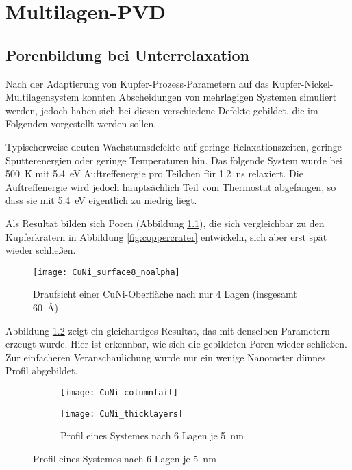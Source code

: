 \chapter{Multilagen-PVD}
\label{appendix:multilayer}

\section{Porenbildung bei Unterrelaxation}

Nach der Adaptierung von Kupfer-Prozess-Parametern auf das Kupfer-Nickel-Multilagensystem konnten Abscheidungen von mehrlagigen Systemen simuliert werden, jedoch haben sich bei diesen verschiedene Defekte gebildet, die im Folgenden vorgestellt werden sollen.

Typischerweise deuten Wachstumsdefekte auf geringe Relaxationszeiten, geringe Sputterenergien oder geringe Temperaturen hin.
Das folgende System wurde bei \SI{500}{\kelvin} mit \SI{5.4}{\electronvolt} Auftreffenergie pro Teilchen für \SI{1.2}{\nano\second} relaxiert.
Die Auftreffenergie wird jedoch hauptsächlich Teil vom Thermostat abgefangen, so dass sie mit \SI{5.4}{\electronvolt} eigentlich zu niedrig liegt.

Als Resultat bilden sich Poren (Abbildung \ref{fig:multilayer_surfacefail}), die sich vergleichbar zu den Kupferkratern in Abbildung \ref{fig:coppercrater} entwickeln, sich aber erst spät wieder schließen.

\begin{figure}[h]
  \centering
  \texttt{[image: CuNi\_surface8\_noalpha]}
  \caption{Draufsicht einer CuNi-Oberfläche nach nur 4 Lagen (insgesamt \SI{60}{\angstrom})}
  \label{fig:multilayer_surfacefail}
\end{figure}

\clearpage
Abbildung \ref{fig:multilayer_columnfail} zeigt ein gleichartiges Resultat, das mit denselben Parametern erzeugt wurde.
Hier ist erkennbar, wie sich die gebildeten Poren wieder schließen.
Zur einfacheren Veranschaulichung wurde nur ein wenige Nanometer dünnes Profil abgebildet.

\begin{figure}[h]
  \caption{Profile fehlgeschlagener Simulationen von Multilagen-Abscheidungen}
  \captionsetup[subfigure]{singlelinecheck=false}
  \def\subfigwidth{7cm}
  \begin{subfigure}[t]{\subfigwidth}
    \texttt{[image: CuNi\_columnfail]}
    \label{fig:multilayer_columnfail}
  \end{subfigure}
  \hfill
  \begin{subfigure}[t]{\subfigwidth}
    \texttt{[image: CuNi\_thicklayers]}
    \caption{Profil eines Systemes nach 6 Lagen je \SI{5}{\nano\meter}}
    \label{fig:multilayer_thickfail}
  \end{subfigure}
\end{figure}

